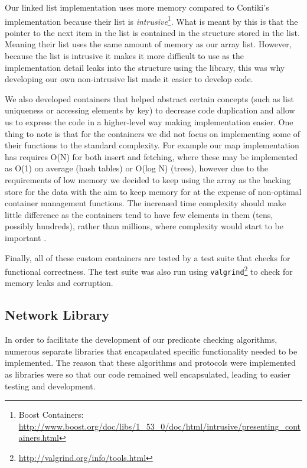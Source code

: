 Our linked list implementation uses more memory compared to Contiki's implementation because their list is \emph{intrusive}\footnote{Boost Containers: \url{http://www.boost.org/doc/libs/1\_53\_0/doc/html/intrusive/presenting\_containers.html}}. What is meant by this is that the pointer to the next item in the list is contained in the structure stored in the list. Meaning their list uses the same amount of memory as our array list. However, because the list is intrusive it makes it more difficult to use as the implementation detail leaks into the structure using the library, this was why developing our own non-intrusive list made it easier to develop code.

We also developed containers that helped abstract certain concepts (such as list uniqueness or accessing elements by key) to decrease code duplication and allow us to express the code in a higher-level way making implementation easier. One thing to note is that for the containers we did not focus on implementing some of their functions to the standard complexity. For example our map implementation has requires O(N) for both insert and fetching, where these may be implemented as O(1) on average (hash tables) or O(log N) (trees), however due to the requirements of low memory we decided to keep using the array as the backing store for the data with the aim to keep memory for at the expense of non-optimal container management functions. The increased time complexity should make little difference as the containers tend to have few elements in them (tens, possibly hundreds), rather than millions, where complexity would start to be important \cite[p.~6]{garey1979computers}.

Finally, all of these custom containers are tested by a test suite that checks for functional correctness. The test suite was also run using \verb|valgrind|\footnote{\url{http://valgrind.org/info/tools.html}} to check for memory leaks and corruption.

\subsection{Network Library}

In order to facilitate the development of our predicate checking algorithms, numerous separate libraries that encapsulated specific functionality needed to be implemented. The reason that these algorithms and protocols were implemented as libraries were so that our code remained well encapsulated, leading to easier testing and development.


